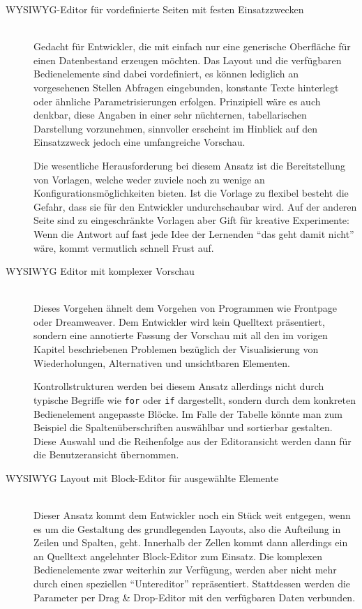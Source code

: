 \begin{description}
\item[ WYSIWYG-Editor für vordefinierte Seiten mit festen Einsatzzwecken] \hfill \\
  Gedacht für Entwickler, die mit \idename{} einfach nur eine generische Oberfläche für einen Datenbestand erzeugen möchten. Das Layout und die verfügbaren Bedienelemente sind dabei vordefiniert, es können lediglich an vorgesehenen Stellen Abfragen eingebunden, konstante Texte hinterlegt oder ähnliche Parametrisierungen erfolgen. Prinzipiell wäre es auch denkbar, diese Angaben in einer sehr nüchternen, tabellarischen Darstellung vorzunehmen, sinnvoller erscheint im Hinblick auf den Einsatzzweck jedoch eine umfangreiche Vorschau.

  Die wesentliche Herausforderung bei diesem Ansatz ist die Bereitstellung von Vorlagen, welche weder zuviele noch zu wenige an Konfigurationsmöglichkeiten bieten. Ist die Vorlage zu flexibel besteht die Gefahr, dass sie für den Entwickler undurchschaubar wird. Auf der anderen Seite sind zu eingeschränkte Vorlagen aber Gift für kreative Experimente: Wenn die Antwort auf fast jede Idee der Lernenden "`das geht damit nicht"' wäre, kommt vermutlich schnell Frust auf.

\item[ WYSIWYG Editor mit komplexer Vorschau] \hfill \\
  Dieses Vorgehen ähnelt dem Vorgehen von Programmen wie Frontpage oder Dreamweaver. Dem Entwickler wird kein Quelltext präsentiert, sondern eine annotierte Fassung der Vorschau mit all den im vorigen Kapitel beschriebenen Problemen bezüglich der Visualisierung von Wiederholungen, Alternativen und unsichtbaren Elementen.

  Kontrollstrukturen werden bei diesem Ansatz allerdings nicht durch typische Begriffe wie \texttt{for} oder \texttt{if} dargestellt, sondern durch dem konkreten Bedienelement angepasste Blöcke. Im Falle der Tabelle könnte man zum Beispiel die Spaltenüberschriften auswählbar und sortierbar gestalten. Diese Auswahl und die Reihenfolge aus der Editoransicht werden dann für die Benutzeransicht übernommen.
\item[ WYSIWYG Layout mit Block-Editor für ausgewählte Elemente] \hfill \\
  Dieser Ansatz kommt dem Entwickler noch ein Stück weit entgegen, wenn es um die Gestaltung des grundlegenden Layouts, also die Aufteilung in Zeilen und Spalten, geht. Innerhalb der Zellen kommt dann allerdings ein an Quelltext angelehnter Block-Editor zum Einsatz. Die komplexen Bedienelemente zwar weiterhin zur Verfügung, werden aber nicht mehr durch einen speziellen "`Untereditor"' repräsentiert. Stattdessen werden die Parameter per Drag \& Drop-Editor mit den verfügbaren Daten verbunden.
  

\end{description}
